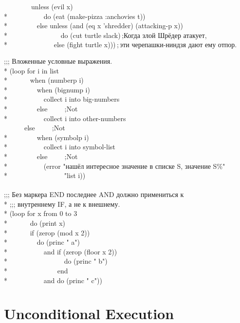 \begin{defloop}
\begin{lisp}
~~~~~~~~unless (evil x) \\*
~~~~~~~~~~do (eat (make-pizza :anchovies t)) \\*
~~~~~~~~else unless (and (eq x 'shredder) (attacking-p x))\\*
~~~~~~~~~~~~~~~do (cut turtle slack)\,;\textrm{Когда злой Шрёдер атакует,} \\*
~~~~~~~~~~~~~else (fight turtle x)))\,;\,\textrm{эти черепашки-ниндзя дают ему отпор.}
\end{lisp}
\goodbreak
\begin{lisp}
;;; Вложенные условные выражения. \\*
(loop for i in list \\*
~~~~~~when (numberp i) \\*
~~~~~~~~when (bignump i) \\*
~~~~~~~~~~collect i into big-numbers \\*
~~~~~~~~else~~~~~;\textrm{Not } \\*
~~~~~~~~~~collect i into other-numbers \\
~~~~~~else~~~~~;\textrm{Not } \\*
~~~~~~~~when (symbolp i)  \\*
~~~~~~~~~~collect i into symbol-list \\*
~~~~~~~~else~~~~~;\textrm{Not } \\*
~~~~~~~~~~(error "нашёл интересное значение в списке {\Xtilde}S, значение {\Xtilde}S{\Xtilde}\%" \\*
~~~~~~~~~~~~~~~~"list i)) \\
 \\
;;; Без маркера END последнее AND должно примениться к \\*
;;; внутреннему IF, а не к внешнему. \\*
(loop for x from 0 to 3  \\*
~~~~~~do (print x) \\*
~~~~~~if (zerop (mod x 2)) \\*
~~~~~~~~do (princ " a") \\*
~~~~~~~~~~and if (zerop (floor x 2)) \\*
~~~~~~~~~~~~~~~~do (princ " b") \\*
~~~~~~~~~~~~~~end \\*
~~~~~~~~~~and do (princ " c"))
\end{lisp}
\end{defloop}


\section{Unconditional Execution}
\label{LOOP-UNCOND-SECTION}


